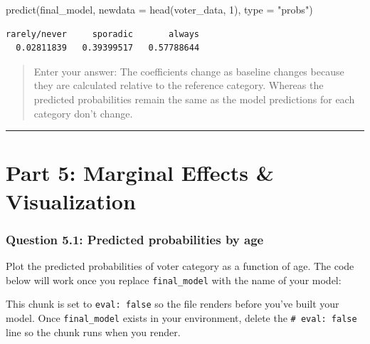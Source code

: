 \documentclass[
  letterpaper,
  DIV=11,
  numbers=noendperiod]{scrartcl}
\newenvironment{Shaded}{\begin{snugshade}}{\end{snugshade}}
\newcommand{\AttributeTok}[1]{\textcolor[rgb]{0.40,0.45,0.13}{#1}}
\newcommand{\DecValTok}[1]{\textcolor[rgb]{0.68,0.00,0.00}{#1}}
\newcommand{\FunctionTok}[1]{\textcolor[rgb]{0.28,0.35,0.67}{#1}}
\newcommand{\NormalTok}[1]{\textcolor[rgb]{0.00,0.23,0.31}{#1}}
\newcommand{\StringTok}[1]{\textcolor[rgb]{0.13,0.47,0.30}{#1}}
\begin{document}
\begin{Shaded}
\begin{Highlighting}[]
\FunctionTok{predict}\NormalTok{(final\_model, }\AttributeTok{newdata =} \FunctionTok{head}\NormalTok{(voter\_data, }\DecValTok{1}\NormalTok{), }\AttributeTok{type =} \StringTok{"probs"}\NormalTok{)}
\end{Highlighting}
\end{Shaded}

\begin{verbatim}
rarely/never     sporadic       always 
  0.02811839   0.39399517   0.57788644 
\end{verbatim}

\begin{quote}
Enter your answer: The coefficients change as baseline changes because
they are calculated relative to the reference category. Whereas the
predicted probabilities remain the same as the model predictions for
each category don't change.
\end{quote}

\begin{center}\rule{0.5\linewidth}{0.5pt}\end{center}

\section{Part 5: Marginal Effects \&
Visualization}\label{part-5-marginal-effects-visualization}

\subsubsection*{Question 5.1: Predicted probabilities by
age}\label{question-5.1-predicted-probabilities-by-age}

Plot the predicted probabilities of voter category as a function of age.
The code below will work once you replace \texttt{final\_model} with the
name of your model:

\begin{tcolorbox}[enhanced jigsaw, toprule=.15mm, opacitybacktitle=0.6, coltitle=black, opacityback=0, bottomrule=.15mm, left=2mm, colframe=quarto-callout-note-color-frame, leftrule=.75mm, toptitle=1mm, colbacktitle=quarto-callout-note-color!10!white, rightrule=.15mm, colback=white, title=\textcolor{quarto-callout-note-color}{\faInfo}\hspace{0.5em}{Note}, arc=.35mm, bottomtitle=1mm, titlerule=0mm, breakable]

This chunk is set to \texttt{eval:\ false} so the file renders before
you've built your model. Once \texttt{final\_model} exists in your
environment, delete the \texttt{\#\textbar{}\ eval:\ false} line so the
chunk runs when you render.

\end{tcolorbox}
\end{document}

